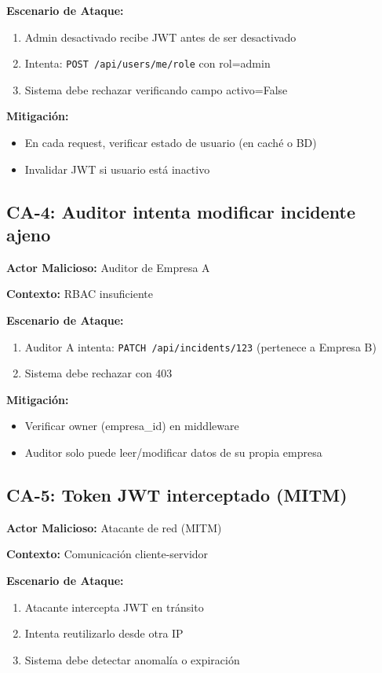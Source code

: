 \documentclass[12pt,a4paper,oneside]{article}
\begin{document}
\textbf{Escenario de Ataque:}
\begin{enumerate}
  \item Admin desactivado recibe JWT antes de ser desactivado
  \item Intenta: \texttt{POST /api/users/me/role} con rol=admin
  \item Sistema debe rechazar verificando campo activo=False
\end{enumerate}

\textbf{Mitigación:}
\begin{itemize}
  \item [OK] En cada request, verificar estado de usuario (en caché o BD)
  \item [OK] Invalidar JWT si usuario está inactivo
\end{itemize}

\subsection{CA-4: Auditor intenta modificar incidente ajeno}

\textbf{Actor Malicioso:} Auditor de Empresa A

\textbf{Contexto:} RBAC insuficiente

\textbf{Escenario de Ataque:}
\begin{enumerate}
  \item Auditor A intenta: \texttt{PATCH /api/incidents/123} (pertenece a Empresa B)
  \item Sistema debe rechazar con 403
\end{enumerate}

\textbf{Mitigación:}
\begin{itemize}
  \item [OK] Verificar owner (empresa\_id) en middleware
  \item [OK] Auditor solo puede leer/modificar datos de su propia empresa
\end{itemize}

\subsection{CA-5: Token JWT interceptado (MITM)}

\textbf{Actor Malicioso:} Atacante de red (MITM)

\textbf{Contexto:} Comunicación cliente-servidor

\textbf{Escenario de Ataque:}
\begin{enumerate}
  \item Atacante intercepta JWT en tránsito
  \item Intenta reutilizarlo desde otra IP
  \item Sistema debe detectar anomalía o expiración
\end{enumerate}
\end{document}
